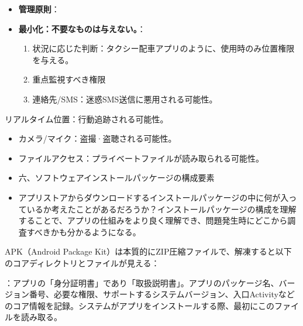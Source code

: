 \begin{itemize}
  \item \textbf{管理原則}：
  \item \textbf{最小化：不要なものは与えない。}：
  \begin{enumerate}
    \item 状況に応じた判断：タクシー配車アプリのように、使用時のみ位置権限を与える。
    \item 重点監視すべき権限
    \item 連絡先/SMS：迷惑SMS送信に悪用される可能性。
  \end{enumerate}
\end{itemize}

\begin{tcbwarn}{リアルタイム位置：行動追跡される可能性。}
\begin{itemize}
  \item カメラ/マイク：盗撮·盗聴される可能性。
  \item ファイルアクセス：プライベートファイルが読み取られる可能性。
  \item 六、ソフトウェアインストールパッケージの構成要素
  \item アプリストアからダウンロードするインストールパッケージの中に何が入っているか考えたことがあるだろうか？インストールパッケージの構成を理解することで、アプリの仕組みをより良く理解でき、問題発生時にどこから調査すべきかも分かるようになる。
\end{itemize}

\end{tcbwarn}


APK（Android Package Kit）は本質的にZIP圧縮ファイルで、解凍すると以下のコアディレクトリとファイルが見える：


：アプリの「身分証明書」であり「取扱説明書」。アプリのパッケージ名、バージョン番号、必要な権限、サポートするシステムバージョン、入口Activityなどのコア情報を記録。システムがアプリをインストールする際、最初にこのファイルを読み取る。

